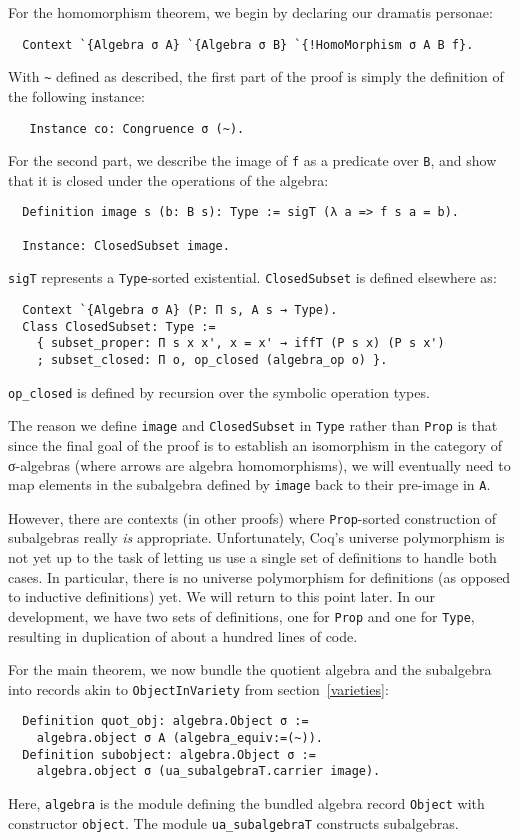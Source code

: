 \documentclass[a4paper,10pt,runningheads]{llncs}
\begin{document}
For the homomorphism theorem, we begin by declaring our dramatis personae:
\begin{lstlisting}
  Context `{Algebra σ A} `{Algebra σ B} `{!HomoMorphism σ A B f}.
\end{lstlisting}
With \lstinline|~| defined as described, the first part of the proof is simply the definition of the following instance:
\begin{lstlisting}
   Instance co: Congruence σ (~).
\end{lstlisting}

For the second part, we describe the image of \lstinline|f| as a predicate over \lstinline|B|, and show that it is closed under the operations of the algebra: 
\begin{lstlisting}
  Definition image s (b: B s): Type := sigT (λ a => f s a = b).

  Instance: ClosedSubset image.
\end{lstlisting}
\lstinline|sigT| represents a \lstinline|Type|-sorted existential. \lstinline|ClosedSubset| is defined elsewhere as:
\begin{lstlisting}
  Context `{Algebra σ A} (P: Π s, A s → Type).
  Class ClosedSubset: Type :=
    { subset_proper: Π s x x', x = x' → iffT (P s x) (P s x')
    ; subset_closed: Π o, op_closed (algebra_op o) }.
\end{lstlisting}
\lstinline|op_closed| is defined by recursion over the symbolic operation types.

The reason we define \lstinline|image| and \lstinline|ClosedSubset| in \lstinline|Type| rather than \lstinline|Prop| is that since the final goal of the proof is to establish an isomorphism in the category of σ-algebras (where arrows are algebra homomorphisms), we will eventually need to map elements in the subalgebra defined by \lstinline|image| back to their pre-image in \lstinline|A|.

However, there are contexts (in other proofs) where \lstinline|Prop|-sorted construction of subalgebras really \emph{is} appropriate. Unfortunately, Coq's universe polymorphism is not yet up to the task of letting us use a single set of definitions to handle both cases. In particular, there is no universe polymorphism for definitions (as opposed to inductive definitions) yet. We will return to this point later. In our development, we have two sets of definitions, one for \lstinline|Prop| and one for \lstinline|Type|, resulting in duplication of about a hundred lines of code.

For the main theorem, we now bundle the quotient algebra and the subalgebra into records akin to \lstinline|ObjectInVariety| from section~\ref{varieties}:
\begin{lstlisting}
  Definition quot_obj: algebra.Object σ :=
    algebra.object σ A (algebra_equiv:=(~)).
  Definition subobject: algebra.Object σ :=
    algebra.object σ (ua_subalgebraT.carrier image).
\end{lstlisting}
Here, \lstinline|algebra| is the module defining the bundled algebra record \lstinline|Object| with constructor \lstinline|object|. The module \lstinline|ua_subalgebraT| constructs subalgebras.
\end{document}
